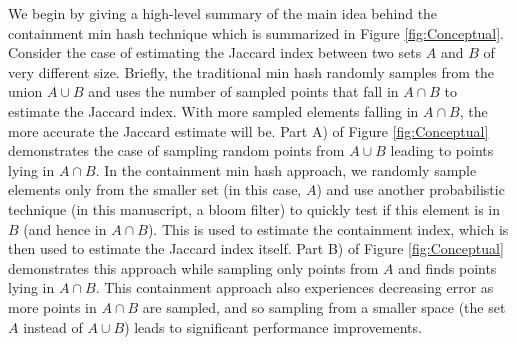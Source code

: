 \documentclass[11pt,reqno]{amsart}
\theoremstyle{remark}
\numberwithin{equation}{section}
\newcommand{\ClassicalConceptual}{\protect }
\newcommand{\ContainmentConceptual}{\protect }
\newcommand{\ClassicalConceptualNumPoints}{\protect }
\newcommand{\ContainmentConceptualNumPoints}{\protect }
\begin{document}
We begin by giving a high-level summary of the main idea behind the containment min hash technique which is summarized in Figure \ref{fig:Conceptual}. Consider the case of estimating the Jaccard index between two sets $A$ and $B$ of very different size. Briefly, the traditional min hash randomly samples from the union $A\cup B$ and uses the number of sampled points that fall in $A\cap B$ to estimate the Jaccard index. With more sampled elements falling in $A\cap B$, the more accurate the Jaccard estimate will be. Part A) of Figure \ref{fig:Conceptual} demonstrates the case of sampling \ClassicalConceptualNumPoints random points from $A\cup B$ leading to \ClassicalConceptual points lying in $A\cap B$. In the containment min hash approach, we randomly sample elements only from the smaller set (in this case, $A$) and use another probabilistic technique (in this manuscript, a bloom filter) to quickly test if this element is in $B$ (and hence in $A\cap B$). This is used to estimate the containment index, which is then used to estimate the Jaccard index itself. Part B) of Figure \ref{fig:Conceptual} demonstrates this approach while sampling only \ContainmentConceptualNumPoints points from $A$ and finds \ContainmentConceptual points lying in $A\cap B$. This containment approach also experiences decreasing error as more points in $A\cap B$ are sampled, and so sampling from a smaller space (the set $A$ instead of $A\cup B$) leads to significant performance improvements.


\end{document}
